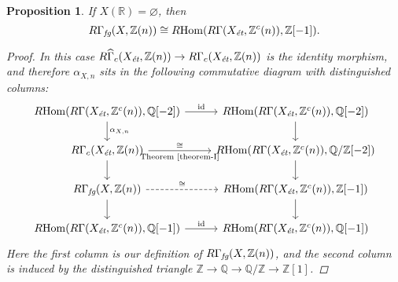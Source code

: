\documentclass{article}
\DeclareMathOperator{\Hom}{Hom}
\newcommand{\QQ}{\mathbb{Q}}
\newcommand{\RR}{\mathbb{R}}
\newcommand{\ZZ}{\mathbb{Z}}
\renewcommand{\emptyset}{\varnothing}
\newcommand{\et}{\text{\it ét}}
\newcommand{\fg}{\text{\it fg}}
\newcommand{\RHom}{R\!\Hom}
\newtheorem{proposition}[theorem]{Proposition}
\theoremstyle{definition}
\numberwithin{equation}{section}
\begin{document}
\begin{proposition}
  \label{prop:RGamma-fg-for-X(R)-empty}
  If $X (\RR) = \emptyset$, then
  \[ R\Gamma_\fg (X, \ZZ (n)) \cong
  \RHom (R\Gamma (X_\et, \ZZ^c (n)), \ZZ [-1]). \]

  \begin{proof}
    In this case
    $R\widehat{\Gamma}_c (X_\et, \ZZ (n)) \to R\Gamma_c (X_\et, \ZZ (n))$
    is the identity morphism, and therefore $\alpha_{X,n}$ sits in the following
    commutative diagram with distinguished columns:
    \[ \begin{tikzcd}
      \RHom (R\Gamma (X_\et, \ZZ^c (n)), \QQ [-2])\ar{d}{\alpha_{X,n}} \ar{r}{\mathrm{id}} & \RHom (R\Gamma (X_\et, \ZZ^c (n)), \QQ [-2])\ar{d} \\
      R\Gamma_c (X_\et, \ZZ (n))\ar{d} \ar{r}{\cong}[swap]{\text{Theorem~\ref{theorem-I}}} & \RHom (R\Gamma (X_\et, \ZZ^c (n)), \QQ/\ZZ [-2])\ar{d} \\
      R\Gamma_\fg (X, \ZZ (n))\ar{d} \ar[dashed]{r}{\cong} & \RHom (R\Gamma (X_\et, \ZZ^c (n)), \ZZ [-1])\ar{d} \\
      \RHom (R\Gamma (X_\et, \ZZ^c (n)), \QQ [-1]) \ar{r}{\mathrm{id}} & \RHom (R\Gamma (X_\et, \ZZ^c (n)), \QQ [-1])
    \end{tikzcd} \]
    Here the first column is our definition of $R\Gamma_\fg (X, \ZZ (n))$,
    and the second column is induced by the distinguished triangle
    $\ZZ \to \QQ \to \QQ/\ZZ \to \ZZ [1]$.
  \end{proof}
\end{proposition}
\end{document}
